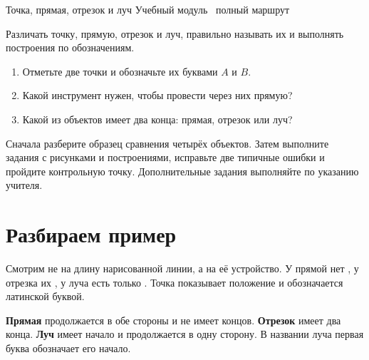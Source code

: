 \worksheettitle
  {Точка, прямая, отрезок и луч}
  { Учебный модуль \textbullet\ полный маршрут}

\studentnameblock

\begin{notebox}
  Различать точку, прямую, отрезок и луч, правильно называть их и выполнять
  построения по обозначениям.
\end{notebox}

\begin{checkpointbox}
  \begin{enumerate}[label=\textbf{\arabic*.}]
    \item Отметьте две точки и обозначьте их буквами $A$ и $B$.
      \workarea{12mm}
    \item Какой инструмент нужен, чтобы провести через них прямую?
      \answerblank[45mm]
    \item Какой из объектов имеет два конца: прямая, отрезок или луч?
      \answerblank[35mm]
  \end{enumerate}
\end{checkpointbox}

\begin{notebox}
  Сначала разберите образец сравнения четырёх объектов. Затем выполните
  задания с рисунками и построениями, исправьте две типичные ошибки и пройдите
  контрольную точку. Дополнительные задания выполняйте по указанию учителя.
\end{notebox}

\section{Разбираем пример}

\objectscomparisonfigure

\begin{fillbox}
  Смотрим не на длину нарисованной линии, а на её устройство.
  У прямой нет \answerblank[24mm], у отрезка их \answerblank[16mm], у луча
  есть только \answerblank[24mm]. Точка показывает положение и обозначается
  \answerblank[38mm] латинской буквой.
\end{fillbox}

\begin{notebox}
  \textbf{Прямая} продолжается в обе стороны и не имеет концов.
  \textbf{Отрезок} имеет два конца. \textbf{Луч} имеет начало и продолжается
  в одну сторону. В названии луча первая буква обозначает его начало.
\end{notebox}

